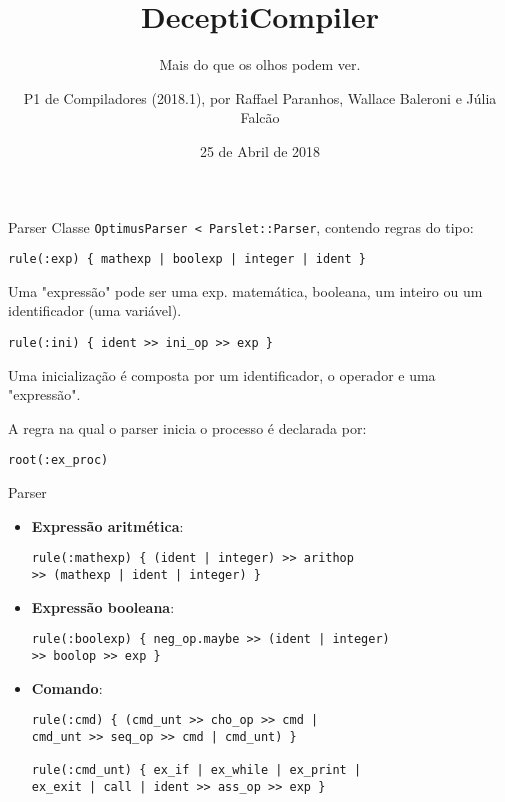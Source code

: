 \documentclass{beamer}
\title{DeceptiCompiler}
\subtitle{Mais do que os olhos podem ver.}
\author[Abbrev.]{P1 de Compiladores (2018.1), por Raffael Paranhos, Wallace Baleroni e Júlia Falcão}
\institute[UFF]{Universidade Federal Fluminense}
\date{25 de Abril de 2018}
\begin{document}

\begin{frame}[plain]

\titlepage

\end{frame}


\begin{frame}[fragile]{Parser}
Classe \verb|OptimusParser < Parslet::Parser|, contendo regras do tipo:
\begin{verbatim}
rule(:exp) { mathexp | boolexp | integer | ident }
\end{verbatim}

Uma "expressão" pode ser uma exp. matemática, booleana, um inteiro ou um identificador (uma variável).

\begin{verbatim}
rule(:ini) { ident >> ini_op >> exp }
\end{verbatim}
Uma inicialização é composta por um identificador, o operador e uma "expressão".


A regra na qual o parser inicia o processo é declarada por:
\begin{verbatim}
root(:ex_proc)
\end{verbatim}

\end{frame}


\begin{frame}[fragile]{Parser}
\begin{itemize}
\item \textbf{Expressão  aritmética}:
\begin{verbatim}
rule(:mathexp) { (ident | integer) >> arithop
>> (mathexp | ident | integer) }
\end{verbatim}


\item \textbf{Expressão booleana}:
\begin{verbatim}
rule(:boolexp) { neg_op.maybe >> (ident | integer)
>> boolop >> exp }
\end{verbatim}

\item \textbf{Comando}:
\begin{verbatim}
rule(:cmd) { (cmd_unt >> cho_op >> cmd |
cmd_unt >> seq_op >> cmd | cmd_unt) }

rule(:cmd_unt) { ex_if | ex_while | ex_print |
ex_exit | call | ident >> ass_op >> exp }
\end{verbatim}

\end{itemize}

\end{frame}
\end{document}
